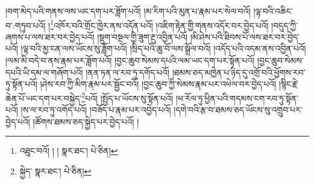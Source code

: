 །བག་མེད་པའི་གནས་ལས་ཡང་དག་པར་ཟློག་པའོ། །མ་རིག་པའི་མུན་པ་རྣམ་པར་སེལ་བའོ། །ལྟ་བའི་འཆིང་བ་:གཏུབ་པའོ། །\footnote{འཐུང་བའོ། ། །  སྣར་ཐང་།  པེ་ཅིན། }འཁོར་བའི་གྲོང་ཁྱེར་ནས་འདོན་པའོ། །འཇིག་རྟེན་གྱི་གནས་འདོར་བར་བྱེད་པའོ། །བདུད་ཀྱི་ཞགས་པ་ལས་ཐར་བར་བྱེད་པའོ། །སྡུག་བསྔལ་གྱི་ཟུག་རྔུ་འབྱིན་པའོ། །མི་ཤེས་པའི་ཐིབས་པོ་ལས་ཐར་བར་བྱེད་པའོ། །ལྟ་བའི་མྱ་ངན་ལས་ཡོངས་སུ་ཟློག་པའོ། །སྲིད་པའི་ཆུ་བོ་ལས་སྒྲོལ་བའོ། །འདོད་པའི་འདམ་ནས་འབྱིན་པའོ། །ལམ་མི་བདེ་བ་ནས་རྣམ་པར་ཟློག་པའོ། །བྱང་ཆུབ་སེམས་དཔའི་ལམ་ཡང་དག་པར་སྟོན་པའོ། །བྱང་ཆུབ་སེམས་དཔའི་ཡི་དམ་ལ་གཞོག་པའོ། །ནན་ཏན་ལ་རབ་ཏུ་དགོད་པའོ། །ཐམས་ཅད་མཁྱེན་པ་ཉིད་དུ་འགྲོ་བའི་ཕྱོགས་རབ་ཏུ་སྟོན་པའོ། །ཤེས་རབ་ཀྱི་མིག་རྣམ་པར་སྦྱོང་བའོ། །བྱང་ཆུབ་ཀྱི་སེམས་རྣམ་པར་འཕེལ་བར་བྱེད་པའོ། །སྙིང་རྗེ་ཆེན་པོ་ཡང་དག་པར་བསྐྱེད་\footnote{སྐྱེད་  སྣར་ཐང་།  པེ་ཅིན། }པའོ། །སྤྱོད་པ་ཡོངས་སུ་སྟོན་པའོ། །ཕ་རོལ་ཏུ་ཕྱིན་པའི་གདམས་ངག་རབ་ཏུ་སྟོན་པའོ། །ས་ལ་རབ་ཏུ་འགོད་པའོ། །བཟོད་པ་རྣམ་པར་འབྱེད་པའོ། །དགེ་བའི་རྩ་བ་ཐམས་ཅད་ཡོངས་སུ་འགྲུབ་པར་བྱེད་པའོ། །ཚོགས་ཐམས་ཅད་སྐྱེད་པར་བྱེད་པའོ། །
